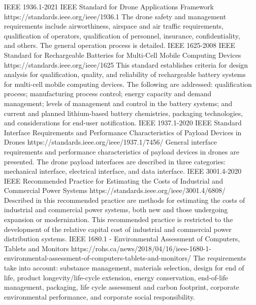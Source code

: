\documentclass[12pt]{article}
\begin{document}
        \ieeestd
        {IEEE 1936.1-2021 IEEE Standard for Drone Applications Framework}
        {https://standards.ieee.org/ieee/1936.1}
        {The drone safety and management requirements include airworthiness, airspace and air traffic requirements, qualification of operators, qualification of personnel, insurance, confidentiality, and others. The general operation process is detailed.}
        \ieeestd
        {IEEE 1625-2008 IEEE Standard for Rechargeable Batteries for Multi-Cell Mobile Computing Devices}
        {https://standards.ieee.org/ieee/1625}
        {This standard establishes criteria for design analysis for qualification, quality, and reliability of rechargeable battery systems for multi-cell mobile computing devices. The following are addressed: qualification process; manufacturing process control; energy capacity and demand management; levels of management and control in the battery systems; and current and planned lithium-based battery chemistries, packaging technologies, and considerations for end-user notification.}
        \ieeestd
        {IEEE 1937.1-2020 IEEE Standard Interface Requirements and Performance Characteristics of Payload Devices in Drones}
        {https://standards.ieee.org/ieee/1937.1/7456/}
        {General interface requirements and performance characteristics of payload devices in drones are presented. The drone payload interfaces are described in three categories: mechanical interface, electrical interface, and data interface.}
        \ieeestd
        {IEEE 3001.4-2020 IEEE Recommended Practice for Estimating the Costs of Industrial and Commercial Power Systems}
        {https://standards.ieee.org/ieee/3001.4/6808/}
        {Described in this recommended practice are methods for estimating the costs of industrial and commercial power systems, both new and those undergoing expansion or modernization. This recommended practice is restricted to the development of the relative capital cost of industrial and commercial power distribution systems.}
        \ieeestd
        {IEEE 1680.1 - Environmental Assessment of Computers, Tablets and Monitors}
        {https://rohs.ca/news/2018/04/16/ieee-1680-1-environmental-assessment-of-computers-tablets-and-monitors/}
        {The requirements take into account: substance management, materials selection, design for end of life, product longevity/life-cycle extension, energy conservation, end-of-life management, packaging, life cycle assessment and carbon footprint, corporate environmental performance, and corporate social responsibility.}
\end{document}
